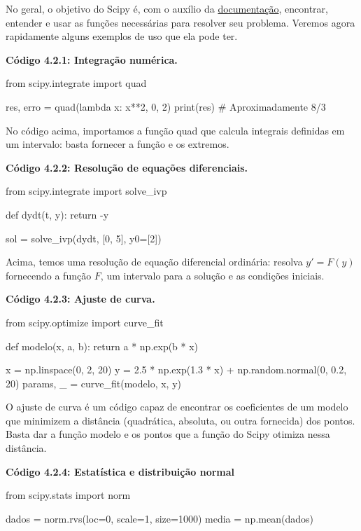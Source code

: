 \documentclass[11pt, a4paper]{article}
\begin{document}
No geral, o objetivo do Scipy é, com o auxílio da \href{https://docs.scipy.org/doc/scipy/}{documentação}, encontrar, entender e usar as funções necessárias para resolver seu problema. Veremos agora rapidamente alguns exemplos de uso que ela pode ter.

\textbf{Código 4.2.1: Integração numérica.}

\begin{code}
from scipy.integrate import quad

res, erro = quad(lambda x: x**2, 0, 2)
print(res) # Aproximadamente 8/3
\end{code}

No código acima, importamos a função quad que calcula integrais definidas em um intervalo: basta fornecer a função e os extremos.

\textbf{Código 4.2.2: Resolução de equações diferenciais.}

\begin{code}
from scipy.integrate import solve_ivp

def dydt(t, y):
    return -y

sol = solve_ivp(dydt, [0, 5], y0=[2])
\end{code}

Acima, temos uma resolução de equação diferencial ordinária: resolva \(y'=F(y)\) fornecendo a função \(F\), um intervalo para a solução e as condições iniciais.

\textbf{Código 4.2.3: Ajuste de curva.}

\begin{code}
from scipy.optimize import curve_fit

def modelo(x, a, b):
    return a * np.exp(b * x)

x = np.linspace(0, 2, 20)
y = 2.5 * np.exp(1.3 * x) + np.random.normal(0, 0.2, 20)
params, _ = curve_fit(modelo, x, y)
\end{code}

O ajuste de curva é um código capaz de encontrar os coeficientes de um modelo que minimizem a distância (quadrática, absoluta, ou outra fornecida) dos pontos. Basta dar a função modelo e os pontos que a função do Scipy otimiza nessa distância. 

\textbf{Código 4.2.4: Estatística e distribuição normal}

\begin{code}
from scipy.stats import norm

dados = norm.rvs(loc=0, scale=1, size=1000)
media = np.mean(dados)
\end{code}
\end{document}
